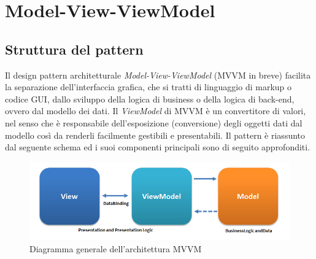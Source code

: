 \documentclass[openany,12pt,a4paper]{report}
\begin{document}
	
	\chapter{Model-View-ViewModel}
	
	\section{Struttura del pattern}
	
	Il design pattern architetturale \textit{Model-View-ViewModel} (MVVM in breve) facilita la separazione dell'interfaccia grafica, che si tratti di linguaggio di markup o codice GUI, dallo sviluppo della logica di business o della logica di back-end, ovvero dal modello dei dati. Il \textit{ViewModel} di MVVM è un convertitore di valori, nel senso che è responsabile dell'esposizione (conversione) degli oggetti dati dal modello così da renderli facilmente gestibili e presentabili. Il pattern è riassunto dal seguente schema ed i suoi componenti principali sono di seguito approfonditi.\\
	
	\begin{figure}[H]
		\includegraphics[scale=0.7]{MVVMPattern}
		\centering
		\caption{Diagramma generale dell'architettura MVVM}
	\end{figure}
	
\end{document}
